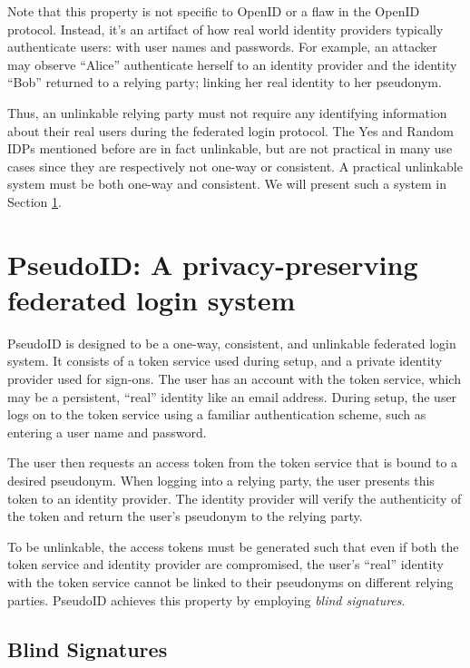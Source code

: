 \documentclass[11pt]{llncs}
\begin{document}
Note that this property is not specific to OpenID or a flaw in the
OpenID protocol. Instead, it's an artifact of how real world identity
providers typically authenticate users: with user names and
passwords. For example, an attacker may observe ``Alice'' authenticate
herself to an identity provider and the identity ``Bob'' returned to a relying
party; linking her real identity to her pseudonym.

Thus, an unlinkable relying party must not require any identifying
information about their real users during the federated login
protocol. The Yes and Random IDPs mentioned before are in fact
unlinkable, but are not practical in many use cases since they are
respectively not one-way or consistent. A practical unlinkable system
must be both one-way and consistent. We will present such a system in
Section \ref{sec:pseudoid}.

\section{PseudoID: A privacy-preserving federated login system}
\label{sec:pseudoid}

PseudoID is designed to be a one-way, consistent, and unlinkable
federated login system. It consists of a token service used during
setup, and a private identity provider used for sign-ons. The user has
an account with the token service, which may be a persistent, ``real''
identity like an email address. During setup, the user logs on to the
token service using a familiar authentication scheme, such as entering
a user name and password.

The user then requests an access token from the token service that is
bound to a desired pseudonym. When logging into a relying party, the
user presents this token to an identity provider. The identity
provider will verify the authenticity of the token and return the
user's pseudonym to the relying party.

To be unlinkable, the access tokens must be generated such that even
if both the token service and identity provider are compromised, the
user's ``real'' identity with the token service cannot be linked to
their pseudonyms on different relying parties. PseudoID achieves this
property by employing \textit{blind signatures}.

\subsection{Blind Signatures}
\label{section:blind-sigs}
\end{document}
